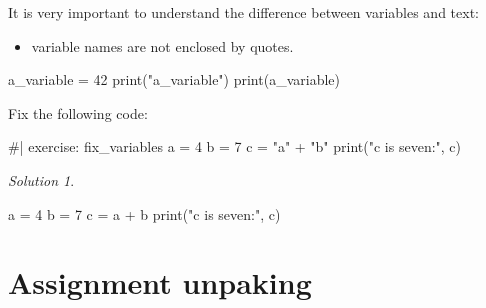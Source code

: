\documentclass[
  letterpaper,
  DIV=11,
  numbers=noendperiod]{scrreprt}
\newenvironment{Shaded}{\begin{snugshade}}{\end{snugshade}}
\newcommand{\NormalTok}[1]{\textcolor[rgb]{0.00,0.23,0.31}{#1}}
\providecommand{\tightlist}{%
  \setlength{\itemsep}{0pt}\setlength{\parskip}{0pt}}\usepackage{longtable,booktabs,array}
\theoremstyle{remark}
\newtheorem*{solution}{Solution}
\begin{document}
It is very important to understand the difference between variables and
text:

\begin{itemize}
\tightlist
\item
  variable names are not enclosed by quotes.
\end{itemize}

\begin{Shaded}
\begin{Highlighting}[]
\NormalTok{a\_variable = 42}
\NormalTok{print("a\_variable")}
\NormalTok{print(a\_variable)}
\end{Highlighting}
\end{Shaded}

Fix the following code:

\begin{Shaded}
\begin{Highlighting}[]
\NormalTok{\#| exercise: fix\_variables}
\NormalTok{a = 4}
\NormalTok{b = 7}
\NormalTok{c = "a" + "b"}
\NormalTok{print("c is seven:", c)}
\end{Highlighting}
\end{Shaded}

\begin{solution}
\leavevmode

\begin{tcolorbox}[enhanced jigsaw, opacityback=0, colframe=quarto-callout-tip-color-frame, breakable, colback=white, colbacktitle=quarto-callout-tip-color!10!white, titlerule=0mm, left=2mm, toprule=.15mm, coltitle=black, opacitybacktitle=0.6, bottomrule=.15mm, arc=.35mm, leftrule=.75mm, bottomtitle=1mm, toptitle=1mm, rightrule=.15mm, title=\textcolor{quarto-callout-tip-color}{\faLightbulb}\hspace{0.5em}{Tip}]

\begin{Shaded}
\begin{Highlighting}[]
\NormalTok{a = 4}
\NormalTok{b = 7}
\NormalTok{c = a + b}
\NormalTok{print("c is seven:", c)}
\end{Highlighting}
\end{Shaded}

\end{tcolorbox}

\end{solution}

\section{Assignment unpaking}\label{assignment-unpaking}
\end{document}
